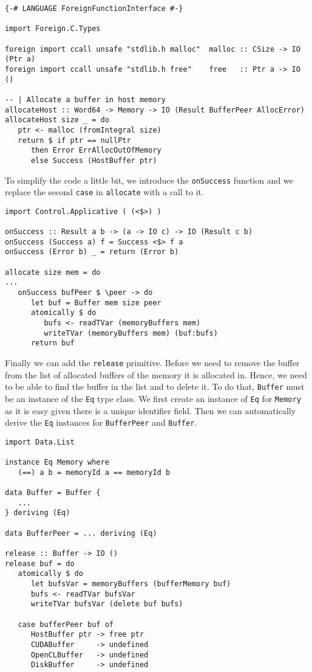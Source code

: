 \begin{lstlisting}
{-# LANGUAGE ForeignFunctionInterface #-}

import Foreign.C.Types

foreign import ccall unsafe "stdlib.h malloc"  malloc :: CSize -> IO (Ptr a)
foreign import ccall unsafe "stdlib.h free"    free   :: Ptr a -> IO ()

-- | Allocate a buffer in host memory
allocateHost :: Word64 -> Memory -> IO (Result BufferPeer AllocError)
allocateHost size _ = do
   ptr <- malloc (fromIntegral size)
   return $ if ptr == nullPtr
      then Error ErrAllocOutOfMemory
      else Success (HostBuffer ptr)
\end{lstlisting}


To simplify the code a little bit, we introduce the \texttt{onSuccess} function
and we replace the second \texttt{case} in \texttt{allocate} with a call to it.

\begin{lstlisting}
import Control.Applicative ( (<$>) )

onSuccess :: Result a b -> (a -> IO c) -> IO (Result c b)
onSuccess (Success a) f = Success <$> f a
onSuccess (Error b) _ = return (Error b)

allocate size mem = do
...
   onSuccess bufPeer $ \peer -> do
      let buf = Buffer mem size peer
      atomically $ do
         bufs <- readTVar (memoryBuffers mem)
         writeTVar (memoryBuffers mem) (buf:bufs)
      return buf
\end{lstlisting}

Finally we can add the \texttt{release} primitive. Before we need to remove the
buffer from the list of allocated buffers of the memory it is allocated in.
Hence, we need to be able to find the buffer in the list and to delete it. To do
that, \texttt{Buffer} must be an instance of the \texttt{Eq} type class. We
first create an instance of \texttt{Eq} for \texttt{Memory} as it is easy given
there is a unique identifier field. Then we can automatically derive the
\texttt{Eq} instances for \texttt{BufferPeer} and \texttt{Buffer}.

\begin{lstlisting}
import Data.List

instance Eq Memory where
   (==) a b = memoryId a == memoryId b

data Buffer = Buffer {
   ...
} deriving (Eq)

data BufferPeer = ... deriving (Eq)

release :: Buffer -> IO ()
release buf = do
   atomically $ do
      let bufsVar = memoryBuffers (bufferMemory buf)
      bufs <- readTVar bufsVar
      writeTVar bufsVar (delete buf bufs)

   case bufferPeer buf of
      HostBuffer ptr -> free ptr
      CUDABuffer     -> undefined
      OpenCLBuffer   -> undefined
      DiskBuffer     -> undefined
\end{lstlisting}

